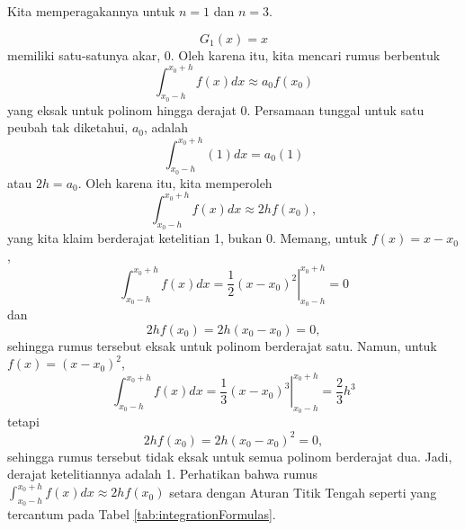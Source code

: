 Kita memperagakannya untuk $n=1$ dan $n=3$.

\[
G_{1}(x)=x
\]
memiliki satu-satunya akar, $0$. Oleh karena itu, kita mencari rumus
berbentuk 
\[
\int_{x_{0}-h}^{x_{0}+h}f(x)dx\approx a_{0}f(x_{0})
\]
yang eksak untuk polinom hingga derajat $0$. Persamaan tunggal untuk
satu peubah tak diketahui, $a_{0}$, adalah
\[
\int_{x_{0}-h}^{x_{0}+h}(1)dx=a_{0}(1)
\]
atau $2h=a_{0}$. Oleh karena itu, kita memperoleh
\[
\int_{x_{0}-h}^{x_{0}+h}f(x)dx\approx2hf(x_{0}),
\]
yang kita klaim berderajat ketelitian 1, bukan 0. Memang, untuk $f(x)=x-x_{0}$,
\[
\int_{x_{0}-h}^{x_{0}+h}f(x)dx=\left.\frac{1}{2}(x-x_{0})^{2}\right|_{x_{0}-h}^{x_{0}+h}=0
\]
 dan
\[
2hf(x_{0})=2h(x_{0}-x_{0})=0,
\]
sehingga rumus tersebut eksak untuk polinom berderajat satu. Namun,
untuk $f(x)=(x-x_{0})^{2}$,
\[
\int_{x_{0}-h}^{x_{0}+h}f(x)dx=\left.\frac{1}{3}(x-x_{0})^{3}\right|_{x_{0}-h}^{x_{0}+h}=\frac{2}{3}h^{3}
\]
tetapi
\[
2hf(x_{0})=2h(x_{0}-x_{0})^{2}=0,
\]
sehingga rumus tersebut tidak eksak untuk semua polinom berderajat
dua. Jadi, derajat ketelitiannya adalah 1. Perhatikan bahwa rumus
${\displaystyle \int_{x_{0}-h}^{x_{0}+h}f(x)dx\approx2hf(x_{0})}$
setara dengan Aturan Titik Tengah seperti yang tercantum pada Tabel
\ref{tab:integrationFormulas}.

